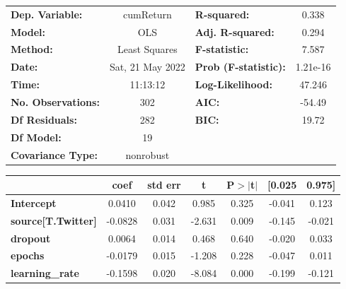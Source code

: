 \begin{center}
\begin{tabular}{lclc}
\toprule
\textbf{Dep. Variable:}                   &    cumReturn     & \textbf{  R-squared:         } &     0.338   \\
\textbf{Model:}                           &       OLS        & \textbf{  Adj. R-squared:    } &     0.294   \\
\textbf{Method:}                          &  Least Squares   & \textbf{  F-statistic:       } &     7.587   \\
\textbf{Date:}                            & Sat, 21 May 2022 & \textbf{  Prob (F-statistic):} &  1.21e-16   \\
\textbf{Time:}                            &     11:13:12     & \textbf{  Log-Likelihood:    } &    47.246   \\
\textbf{No. Observations:}                &         302      & \textbf{  AIC:               } &    -54.49   \\
\textbf{Df Residuals:}                    &         282      & \textbf{  BIC:               } &     19.72   \\
\textbf{Df Model:}                        &          19      & \textbf{                     } &             \\
\textbf{Covariance Type:}                 &    nonrobust     & \textbf{                     } &             \\
\bottomrule
\end{tabular}
\begin{tabular}{lcccccc}
                                          & \textbf{coef} & \textbf{std err} & \textbf{t} & \textbf{P$> |$t$|$} & \textbf{[0.025} & \textbf{0.975]}  \\
\midrule
\textbf{Intercept}                        &       0.0410  &        0.042     &     0.985  &         0.325        &       -0.041    &        0.123     \\
\textbf{source[T.Twitter]}                &      -0.0828  &        0.031     &    -2.631  &         0.009        &       -0.145    &       -0.021     \\
\textbf{dropout}                          &       0.0064  &        0.014     &     0.468  &         0.640        &       -0.020    &        0.033     \\
\textbf{epochs}                           &      -0.0179  &        0.015     &    -1.208  &         0.228        &       -0.047    &        0.011     \\
\textbf{learning\_rate}                   &      -0.1598  &        0.020     &    -8.084  &         0.000        &       -0.199    &       -0.121     \\

\end{tabular}
\end{center}
